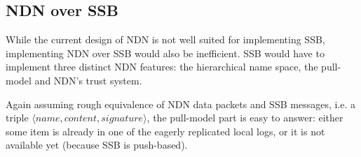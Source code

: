\documentclass[9pt,sigconf]{acmart}
\begin{document}
%
%

\subsection{NDN over SSB}
\label{ssect:ndn-over-ssb}


While the current design of NDN is not well suited for implementing SSB, implementing NDN over SSB would also be inefficient. SSB would have to implement three
distinct NDN features: the hierarchical name space, the pull-model
and NDN's trust system.

Again assuming rough equivalence of NDN data packets and SSB messages,
i.e. a triple $\langle name,content,signature\rangle$, the
pull-model part is easy to answer: either some item is already in one
of the eagerly replicated local logs, or it is not available yet
(because SSB is push-based).
\end{document}
